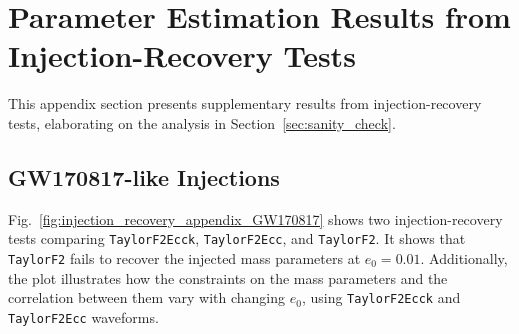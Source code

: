 \documentclass[aps,prd,twocolumn,superscriptaddress,groupedaddress,nofootinbib,showpacs,eqsecnum,useAms]{revtex4-2}
\begin{document}
\section{Parameter Estimation Results from Injection-Recovery Tests}\label{sec:appendix_injection_recovery}

This appendix section presents supplementary results from injection-recovery tests, elaborating on the analysis in Section~\ref{sec:sanity_check}.

\subsection{GW170817-like Injections}

Fig.~\ref{fig:injection_recovery_appendix_GW170817} shows two injection-recovery tests comparing \texttt{TaylorF2Ecck}, \texttt{TaylorF2Ecc}, and \texttt{TaylorF2}. It shows that \texttt{TaylorF2} fails to recover the injected mass parameters at $e_0=0.01$. Additionally, the plot illustrates how the constraints on the mass parameters and the correlation between them vary with changing $e_0$, using \texttt{TaylorF2Ecck} and \texttt{TaylorF2Ecc} waveforms.
\end{document}
